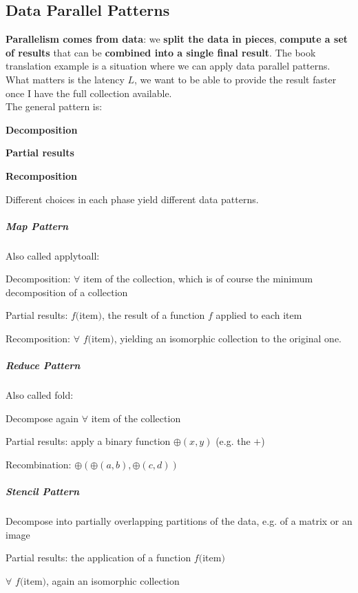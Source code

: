 \documentclass[10pt]{report}
\begin{document}
\subsection{Data Parallel Patterns}
\textbf{Parallelism comes from data}: we \textbf{split the data in pieces}, \textbf{compute a set of results} that can be \textbf{combined into a single final result}. The book translation example is a situation where we can apply data parallel patterns. What matters is the latency $L$, we want to be able to provide the result faster once I have the full collection available.\\
The general pattern is:
\begin{list}{}{}
	\item \textbf{Decomposition}
	\item \textbf{Partial results}
	\item \textbf{Recomposition}
\end{list}
Different choices in each phase yield different data patterns.
\begin{multicols}{2}
\subparagraph{Map Pattern} Also called applytoall:\begin{list}{}{}
	\item Decomposition: $\forall$ item of the collection, which is of course the minimum decomposition of a collection
	\item Partial results: $f($item$)$, the result of a function $f$ applied to each item
	\item Recomposition: $\forall$ $f($item$)$, yielding an isomorphic collection to the original one.
\end{list}
\subparagraph{Reduce Pattern} Also called fold:\begin{list}{}{}
	\item Decompose again $\forall$ item of the collection
	\item Partial results: apply a binary function $\oplus(x,y)$ (e.g. the $+$)
	\item Recombination: $\oplus(\oplus(a,b),\oplus(c,d))$
\end{list}
\end{multicols}
\subparagraph{Stencil Pattern} \begin{list}{}{}
	\item Decompose into partially overlapping partitions of the data, e.g. of a matrix or an image
	\item Partial results: the application of a function $f($item$)$
	\item $\forall$ $f($item$)$, again an isomorphic collection
\end{list}
\end{document}
